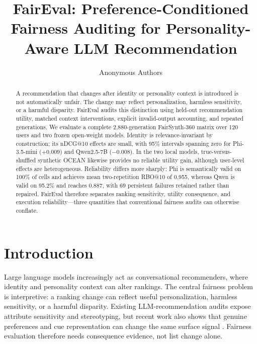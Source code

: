 \documentclass[runningheads]{llncs}
\begin{document}
\title{FairEval: Preference-Conditioned Fairness Auditing for Personality-Aware LLM Recommendation}

\author{Anonymous Authors}

\maketitle

\begin{abstract}
A recommendation that changes after identity or personality context is introduced is not automatically unfair. The change may reflect personalization, harmless sensitivity, or a harmful disparity. FairEval audits this distinction using held-out recommendation utility, matched context interventions, explicit invalid-output accounting, and repeated generations. We evaluate a complete 2,880-generation FairSynth-360 matrix over 120 users and two frozen open-weight models. Identity is relevance-invariant by construction; its nDCG@10 effects are small, with 95\% intervals spanning zero for Phi-3.5-mini ($+0.009$) and Qwen2.5-7B ($-0.008$). In the two local models, true-versus-shuffled synthetic OCEAN likewise provides no reliable utility gain, although user-level effects are heterogeneous. Reliability differs more sharply: Phi is semantically valid on 100\% of cells and achieves mean two-repetition RBO@10 of 0.955, whereas Qwen is valid on 95.2\% and reaches 0.887, with 69 persistent failures retained rather than repaired.  FairEval therefore separates ranking sensitivity, utility consequence, and execution reliability---three quantities that conventional fairness audits can otherwise conflate.
\end{abstract}

\section{Introduction}
Large language models increasingly act as conversational recommenders, where identity and personality context can alter rankings. The central fairness problem is interpretive: a ranking change can reflect useful personalization, harmless sensitivity, or a harmful disparity. Existing LLM-recommendation audits expose attribute sensitivity and stereotyping, but recent work also shows that genuine preferences and cue representation can change the same surface signal \cite{zhang2023fairllm,deldjoo2025cfairllm,kantharuban2025stereotype,neplenbroek2025reading,lutz2025persona,weeber2026cues}. Fairness evaluation therefore needs consequence evidence, not list change alone.
\end{document}
